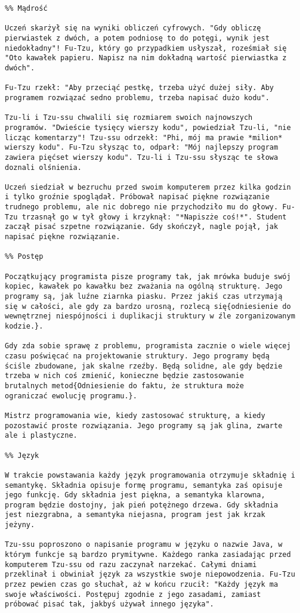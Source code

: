 \begin{verbatim}
%% Mądrość

Uczeń skarżył się na wyniki obliczeń cyfrowych. "Gdy obliczę
pierwiastek z dwóch, a potem podniosę to do potęgi, wynik jest
niedokładny"! Fu-Tzu, który go przypadkiem usłyszał, roześmiał się
"Oto kawałek papieru. Napisz na nim dokładną wartość pierwiastka z
dwóch".

Fu-Tzu rzekł: "Aby przeciąć pestkę, trzeba użyć dużej siły. Aby
programem rozwiązać sedno problemu, trzeba napisać dużo kodu".

Tzu-li i Tzu-ssu chwalili się rozmiarem swoich najnowszych
programów. "Dwieście tysięcy wierszy kodu", powiedział Tzu-li, "nie
licząc komentarzy"! Tzu-ssu odrzekł: "Phi, mój ma prawie *milion*
wierszy kodu". Fu-Tzu słysząc to, odparł: "Mój najlepszy program
zawiera pięćset wierszy kodu". Tzu-li i Tzu-ssu słysząc te słowa
doznali olśnienia.

Uczeń siedział w bezruchu przed swoim komputerem przez kilka godzin
i tylko groźnie spoglądał. Próbował napisać piękne rozwiązanie
trudnego problemu, ale nic dobrego nie przychodziło mu do głowy. Fu-
Tzu trzasnął go w tył głowy i krzyknął: "*Napiszże coś!*". Student
zaczął pisać szpetne rozwiązanie. Gdy skończył, nagle pojął, jak
napisać piękne rozwiązanie.

%% Postęp

Początkujący programista pisze programy tak, jak mrówka buduje swój
kopiec, kawałek po kawałku bez zważania na ogólną strukturę. Jego
programy są, jak luźne ziarnka piasku. Przez jakiś czas utrzymają
się w całości, ale gdy za bardzo urosną, rozlecą się{odniesienie do
wewnętrznej niespójności i duplikacji struktury w źle zorganizowanym
kodzie.}.

Gdy zda sobie sprawę z problemu, programista zacznie o wiele więcej
czasu poświęcać na projektowanie struktury. Jego programy będą
ściśle zbudowane, jak skalne rzeźby. Będą solidne, ale gdy będzie
trzeba w nich coś zmienić, konieczne będzie zastosowanie
brutalnych metod{Odniesienie do faktu, że struktura może
ograniczać ewolucję programu.}.

Mistrz programowania wie, kiedy zastosować strukturę, a kiedy
pozostawić proste rozwiązania. Jego programy są jak glina, zwarte
ale i plastyczne.

%% Język

W trakcie powstawania każdy język programowania otrzymuje składnię i
semantykę. Składnia opisuje formę programu, semantyka zaś opisuje
jego funkcję. Gdy składnia jest piękna, a semantyka klarowna,
program będzie dostojny, jak pień potężnego drzewa. Gdy składnia
jest niezgrabna, a semantyka niejasna, program jest jak krzak
jeżyny.

Tzu-ssu poproszono o napisanie programu w języku o nazwie Java, w
którym funkcje są bardzo prymitywne. Każdego ranka zasiadając przed
komputerem Tzu-ssu od razu zaczynał narzekać. Całymi dniami
przeklinał i obwiniał język za wszystkie swoje niepowodzenia. Fu-Tzu
przez pewien czas go słuchał, aż w końcu rzucił: "Każdy język ma
swoje właściwości. Postępuj zgodnie z jego zasadami, zamiast
próbować pisać tak, jakbyś używał innego języka".
 \end{verbatim}


